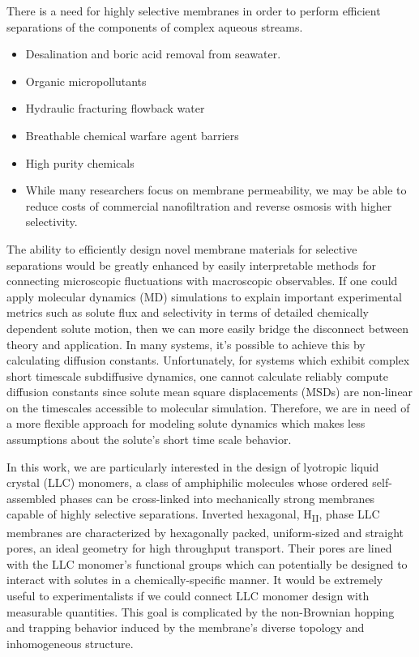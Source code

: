 \documentclass[journal=jpcbfk,manuscript=article]{achemso}
\begin{document}
  There is a need for highly selective membranes in order to perform efficient 
  separations of the components of complex aqueous streams.
  \begin{itemize}
    \item Desalination and boric acid removal from seawater.
    \item Organic micropollutants
    \item Hydraulic fracturing flowback water
    \item Breathable chemical warfare agent barriers
    \item High purity chemicals
    \item While many researchers focus on membrane permeability, we may be 
    able to reduce costs of commercial nanofiltration and reverse osmosis with
    higher selectivity.~\cite{werber_materials_2016}
  \end{itemize}
  
  The ability to efficiently design novel membrane materials for selective separations
  would be greatly enhanced by easily interpretable methods for connecting microscopic
  fluctuations with macroscopic observables. If one could apply molecular dynamics 
  (MD) simulations to explain important experimental metrics such as solute flux and 
  selectivity in terms of detailed chemically dependent solute motion, then we can more
  easily bridge the disconnect between theory and application. In many systems, it's 
  possible to achieve this by calculating diffusion constants. Unfortunately, for 
  systems which exhibit complex short timescale subdiffusive dynamics, one cannot 
  calculate reliably compute diffusion constants since solute mean square 
  displacements (MSDs) are non-linear on the timescales accessible to molecular simulation.
  Therefore, we are in need of a more flexible approach for modeling solute dynamics
  which makes less assumptions about the solute's short time scale behavior.
  
  In this work, we are particularly interested in the design of lyotropic liquid 
  crystal (LLC) monomers, a class of amphiphilic molecules whose ordered self-assembled
  phases can be cross-linked into mechanically strong membranes capable of highly 
  selective separations. Inverted hexagonal, H\textsubscript{II}, phase LLC membranes
  are characterized	by hexagonally packed, uniform-sized and straight pores, an ideal
  geometry for high throughput transport. Their pores are lined with the LLC monomer's
  functional groups which can potentially be designed to interact with solutes in a 
  chemically-specific manner. It would be extremely useful to experimentalists if we 
  could connect LLC monomer design with measurable quantities. This goal is complicated
  by the non-Brownian hopping and trapping behavior induced by the membrane's diverse
  topology and inhomogeneous structure.~\cite{coscia_understanding_2019,coscia_chemically_2019}
  
\end{document}
